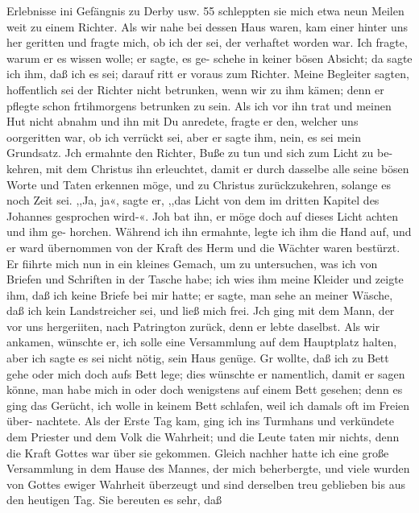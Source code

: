 Erlebnisse ini Gefängnis zu Derby usw. 55
schleppten sie mich etwa neun Meilen weit zu einem Richter.
Als wir nahe bei dessen Haus waren, kam einer hinter uns her
geritten und fragte mich, ob ich der sei, der verhaftet worden
war. Ich fragte, warum er es wissen wolle; er sagte, es ge-
schehe in keiner bösen Absicht; da sagte ich ihm, daß ich es
sei; darauf ritt er voraus zum Richter. Meine Begleiter sagten,
hoffentlich sei der Richter nicht betrunken, wenn wir zu ihm
kämen; denn er pflegte schon frtihmorgens betrunken zu sein.
Als ich vor ihn trat und meinen Hut nicht abnahm und ihn mit
Du anredete, fragte er den, welcher uns oorgeritten war, ob ich
verrückt sei, aber er sagte ihm, nein, es sei mein Grundsatz. Jch
ermahnte den Richter, Buße zu tun und sich zum Licht zu be-
kehren, mit dem Christus ihn erleuchtet, damit er durch dasselbe
alle seine bösen Worte und Taten erkennen möge, und zu Christus
zurückzukehren, solange es noch Zeit sei. ,,Ja, ja«, sagte er, ,,das
Licht von dem im dritten Kapitel des Johannes gesprochen wird-«.
Joh bat ihn, er möge doch auf dieses Licht achten und ihm ge-
horchen. Während ich ihn ermahnte, legte ich ihm die Hand auf,
und er ward übernommen von der Kraft des Herm und die
Wächter waren bestürzt. Er fiihrte mich nun in ein kleines Gemach,
um zu untersuchen, was ich von Briefen und Schriften in der
Tasche habe; ich wies ihm meine Kleider und zeigte ihm, daß
ich keine Briefe bei mir hatte; er sagte, man sehe an meiner
Wäsche, daß ich kein Landstreicher sei, und ließ mich frei. Jch
ging mit dem Mann, der vor uns hergeriiten, nach Patrington
zurück, denn er lebte daselbst. Als wir ankamen, wünschte er, ich
solle eine Versammlung auf dem Hauptplatz halten, aber ich sagte
es sei nicht nötig, sein Haus genüge. Gr wollte, daß ich zu Bett
gehe oder mich doch aufs Bett lege; dies wünschte er namentlich,
damit er sagen könne, man habe mich in oder doch wenigstens
auf einem Bett gesehen; denn es ging das Gerücht, ich wolle
in keinem Bett schlafen, weil ich damals oft im Freien über-
nachtete. Als der Erste Tag kam, ging ich ins Turmhans
und verkündete dem Priester und dem Volk die Wahrheit; und
die Leute taten mir nichts, denn die Kraft Gottes war über sie
gekommen. Gleich nachher hatte ich eine große Versammlung in
dem Hause des Mannes, der mich beherbergte, und viele wurden
von Gottes ewiger Wahrheit überzeugt und sind derselben treu
geblieben bis aus den heutigen Tag. Sie bereuten es sehr, daß


